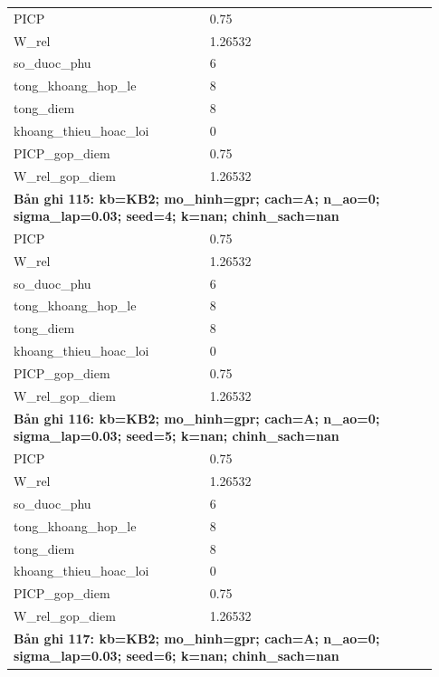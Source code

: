 \begin{longtable}{p{0.43\linewidth}p{0.50\linewidth}}
PICP & 0.75 \\
W\_\allowbreak rel & 1.26532 \\
so\_\allowbreak duoc\_\allowbreak phu & 6 \\
tong\_\allowbreak khoang\_\allowbreak hop\_\allowbreak le & 8 \\
tong\_\allowbreak diem & 8 \\
khoang\_\allowbreak thieu\_\allowbreak hoac\_\allowbreak loi & 0 \\
PICP\_\allowbreak gop\_\allowbreak diem & 0.75 \\
W\_\allowbreak rel\_\allowbreak gop\_\allowbreak diem & 1.26532 \\
\midrule
\multicolumn{2}{p{0.95\linewidth}}{\textbf{Bản ghi 115: kb=KB2; mo\_hinh=gpr; cach=A; n\_ao=0; sigma\_lap=0.03; seed=4; k=nan; chinh\_sach=nan}} \\
PICP & 0.75 \\
W\_\allowbreak rel & 1.26532 \\
so\_\allowbreak duoc\_\allowbreak phu & 6 \\
tong\_\allowbreak khoang\_\allowbreak hop\_\allowbreak le & 8 \\
tong\_\allowbreak diem & 8 \\
khoang\_\allowbreak thieu\_\allowbreak hoac\_\allowbreak loi & 0 \\
PICP\_\allowbreak gop\_\allowbreak diem & 0.75 \\
W\_\allowbreak rel\_\allowbreak gop\_\allowbreak diem & 1.26532 \\
\midrule
\multicolumn{2}{p{0.95\linewidth}}{\textbf{Bản ghi 116: kb=KB2; mo\_hinh=gpr; cach=A; n\_ao=0; sigma\_lap=0.03; seed=5; k=nan; chinh\_sach=nan}} \\
PICP & 0.75 \\
W\_\allowbreak rel & 1.26532 \\
so\_\allowbreak duoc\_\allowbreak phu & 6 \\
tong\_\allowbreak khoang\_\allowbreak hop\_\allowbreak le & 8 \\
tong\_\allowbreak diem & 8 \\
khoang\_\allowbreak thieu\_\allowbreak hoac\_\allowbreak loi & 0 \\
PICP\_\allowbreak gop\_\allowbreak diem & 0.75 \\
W\_\allowbreak rel\_\allowbreak gop\_\allowbreak diem & 1.26532 \\
\midrule
\multicolumn{2}{p{0.95\linewidth}}{\textbf{Bản ghi 117: kb=KB2; mo\_hinh=gpr; cach=A; n\_ao=0; sigma\_lap=0.03; seed=6; k=nan; chinh\_sach=nan}} \\

\end{longtable}
